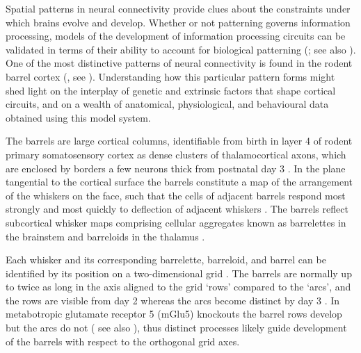 \documentclass[a4paper,11pt]{article}
\begin{document}
Spatial patterns in neural connectivity provide clues about the constraints
under which brains evolve and develop. Whether or not patterning governs
information processing, models of the development of information processing
circuits can be validated in terms of their ability to account for biological
patterning (\citealp{purves_iterated_1992}; see also
\citealp{wilson_what_2015,bednar_cortical_2016}). One of the most distinctive patterns of
neural connectivity is found in the rodent barrel cortex
(\citealp{woolsey_pattern_1948,woolsey_structural_1970,welker_structure_1974}, see
\citealp{fox_barrel_2008}). Understanding how this particular pattern forms might shed
light on the interplay of genetic and extrinsic factors that shape cortical
circuits, and on a wealth of anatomical, physiological, and behavioural data
obtained using this model system.

The barrels are large cortical columns, identifiable from birth in layer 4 of
rodent primary somatosensory cortex as dense clusters of thalamocortical
axons, which are enclosed by borders a few neurons thick from postnatal day 3
\citep{erzurumlu_development_2012}. In the plane tangential to the cortical surface the
barrels constitute a map of the arrangement of the whiskers on the face, such
that the cells of adjacent barrels respond most strongly and most quickly to
deflection of adjacent whiskers \citep{armstrong-james_flow_1992}. The barrels
reflect subcortical whisker maps comprising cellular aggregates known as
barrelettes in the brainstem and barreloids in the thalamus
\citep{killackey_pattern_1980}.

Each whisker and its corresponding barrelette, barreloid, and barrel can be
identified by its position on a two-dimensional grid
\citep{zucker_coding_1969,killackey_pattern_1980,van_der_loos_barreloids_1976}. The barrels are normally up to
twice as long in the axis aligned to the grid ‘rows’ compared to the ‘arcs’,
and the rows are visible from day 2 \citep{rebsam_refinement_2002} whereas the arcs become
distinct by day 3 \citep{erzurumlu_development_2012,rebsam_refinement_2002}. In metabotropic glutamate
receptor 5 (mGlu5) knockouts the barrel rows develop but the arcs do not
(\citealp{hannan_plc-1_2001} see also \citealp{fox_barrel_2008}), thus distinct processes
likely guide development of the barrels with respect to the orthogonal grid
axes.
\end{document}
